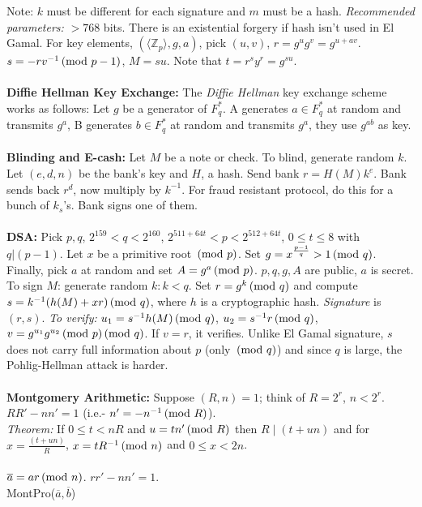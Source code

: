 Note: $k$ must be different for each signature and $m$ must be a hash.
\emph{Recommended parameters:} $>768$ bits.
There is an existential forgery if hash isn't used in El Gamal.
For key elements, $(\langle {\mathbb Z}_p \rangle, g, a)$, pick 
$(u, v)$, $r= g^u g^v = g^{u+av}$.
$s= -rv^{-1} \thinspace \textnormal{(mod } p-1 \textnormal{)}$, $M=su$.  Note that $t=r^s y^r=g^{su}$.
\\
\\
{\bf Diffie Hellman Key Exchange: }
The \emph{Diffie Hellman} key exchange scheme works as follows: Let $g$ be a generator of $F_{q}^*$.
A generates $a \in F_{q}^*$ at random and transmits $g^{a}$,
B generates $b \in F_{q}^*$ at random
and transmits $g^{a}$,  they use $g^{ab}$ as key.
\\
\\
{\bf Blinding and E-cash: } Let $M$ be a note or check.  To blind, generate random
$k$.  Let $(e, d, n)$ be the bank's key and $H$, a hash.  Send bank $r=H(M)k^e$.
Bank sends back $r^d$, now multiply by $k^{-1}$.  For fraud resistant
protocol,
do this for a bunch of $k_s$'s.  Bank signs one of them.  
\\
\\
{\bf DSA: } Pick $p, q$, $2^{159}<q<2^{160}$, $2^{511+64t} < p < 2^{512+64t}$, $0 \le t \le 8$ with
$q|(p-1)$.  
Let $x$ be a primitive root $\thinspace \textnormal{(mod } p \textnormal{)}$.  Set $g= x^{{\frac {p-1} q}}>1 \thinspace \textnormal{(mod } q \textnormal{)}$. 
Finally,
pick $a$ at random and set  $A= g^a \thinspace \textnormal{(mod } p \textnormal{)}$.
$p, q, g, A$ are public, $a$ is secret.  To sign $M$:
generate random $k: k<q$.  Set $r= g^k \thinspace \textnormal{(mod } q \textnormal{)}$ and compute
$s= k^{-1} (h(M) + xr) \thinspace \textnormal{(mod } q \textnormal{)}$, where $h$ is a cryptographic hash.  
\emph{Signature} is $(r, s)$.
\emph{To verify:}
$u_1= s^{-1} h(M) \thinspace \textnormal{(mod } q \textnormal{)}$,
$u_2= s^{-1} r \thinspace \textnormal{(mod } q \textnormal{)}$,
$v= g^{u_1} g^{u_2} \thinspace \textnormal{(mod } p \textnormal{)} \thinspace \textnormal{(mod } q \textnormal{)}$.  If $v=r$, it
verifies.  Unlike El Gamal signature, $s$ does not carry full information about
$p$ (only $\thinspace \textnormal{(mod } q \textnormal{)}$) and since $q$ is large, the Pohlig-Hellman attack is harder.
\\
\\
{\bf Montgomery Arithmetic: }
Suppose $(R, n)=1$; think of $R= 2^r$, $n < 2^r$.
$R R' - n n' = 1$ (i.e.- $n'= -n^{-1} \thinspace \textnormal{(mod } R \textnormal{)}$). \\
\emph{Theorem: }  If $0 \leq t < nR$ and $u=tn' \thinspace \textnormal{(mod } R \textnormal{)}$ then
$R \mid (t+un)$ and for $x= {\frac {(t+un)} R}$, $x= t R^{-1} \thinspace \textnormal{(mod } n \textnormal{)}$ and
$0 \leq x < 2n$.\\
\\
${\overline a}= a r \thinspace \textnormal{(mod } n \textnormal{)}$.
$r r' - n n' = 1$. \\
\jt MontPro(${\overline a}, {\overline b}$) \\
